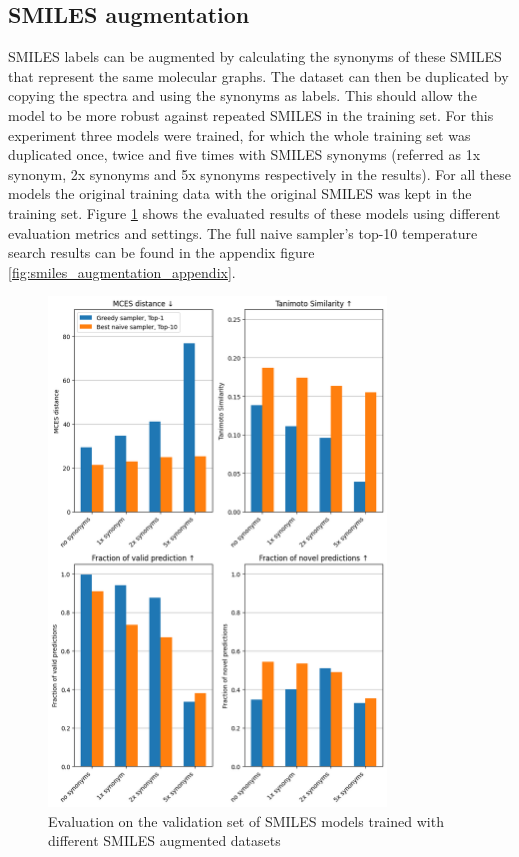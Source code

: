 \subsection{SMILES augmentation}

SMILES labels can be augmented by calculating the synonyms of these SMILES that represent the same molecular graphs.
The dataset can then be duplicated by copying the spectra and using the synonyms as labels.
This should allow the model to be more robust against repeated SMILES in the training set.
For this experiment three models were trained, for which the whole training set was duplicated once, twice and five times with SMILES synonyms (referred as 1x synonym, 2x synonyms and 5x synonyms respectively in the results).
For all these models the original training data with the original SMILES was kept in the training set.
Figure \ref{fig:smiles_augm} shows the evaluated results of these models using different evaluation metrics and settings.
The full naive sampler's top-10 temperature search results can be found in the appendix figure \ref{fig:smiles_augmentation_appendix}.

\begin{figure}[h]
    \centering
    \includegraphics[width=0.8\textwidth]{figures/results/smiles_augmentation_with_tanimoto.png}
    \caption{Evaluation on the validation set of SMILES models trained with different SMILES augmented datasets}
    \label{fig:smiles_augm}
\end{figure}

